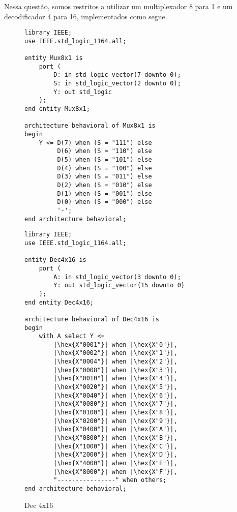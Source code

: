 \documentclass[a4paper,12pt]{article}
\newenvironment{code}{\captionsetup{type=listing}}{}
\newcommand{\hex}[1]{\textcolor{green!50!black}{#1}}
\begin{document}
Nessa questão, somos restritos a utilizar um multiplexador 8 para 1 e um decodificador 4 para 16, implementados como segue.
\begin{figure}[htbp]
    \centering
    \begin{minipage}[t]{0.49\textwidth}
        \centering
        \begin{code}
            \begin{verbatim}
library IEEE;
use IEEE.std_logic_1164.all;

entity Mux8x1 is
    port (
        D: in std_logic_vector(7 downto 0);
        S: in std_logic_vector(2 downto 0);
        Y: out std_logic
    );
end entity Mux8x1;

architecture behavioral of Mux8x1 is
begin
    Y <= D(7) when (S = "111") else
         D(6) when (S = "110") else
         D(5) when (S = "101") else
         D(4) when (S = "100") else
         D(3) when (S = "011") else
         D(2) when (S = "010") else
         D(1) when (S = "001") else
         D(0) when (S = "000") else
         '-';    
end architecture behavioral;
            \end{verbatim}
            \caption{Mux 8x1}
            \label{fig:mux8x1}
        \end{code}
    \end{minipage}
    \hfill
    \begin{minipage}[t]{0.49\textwidth}
        \centering
        \begin{code}
            \begin{verbatim}
library IEEE;
use IEEE.std_logic_1164.all;

entity Dec4x16 is
    port (
        A: in std_logic_vector(3 downto 0);
        Y: out std_logic_vector(15 downto 0)
    );
end entity Dec4x16;

architecture behavioral of Dec4x16 is
begin
    with A select Y <=
        |\hex{X"0001"}| when |\hex{X"0"}|,
        |\hex{X"0002"}| when |\hex{X"1"}|,
        |\hex{X"0004"}| when |\hex{X"2"}|,
        |\hex{X"0008"}| when |\hex{X"3"}|,
        |\hex{X"0010"}| when |\hex{X"4"}|,
        |\hex{X"0020"}| when |\hex{X"5"}|,
        |\hex{X"0040"}| when |\hex{X"6"}|,
        |\hex{X"0080"}| when |\hex{X"7"}|,
        |\hex{X"0100"}| when |\hex{X"8"}|,
        |\hex{X"0200"}| when |\hex{X"9"}|,
        |\hex{X"0400"}| when |\hex{X"A"}|,
        |\hex{X"0800"}| when |\hex{X"B"}|,
        |\hex{X"1000"}| when |\hex{X"C"}|,
        |\hex{X"2000"}| when |\hex{X"D"}|,
        |\hex{X"4000"}| when |\hex{X"E"}|,
        |\hex{X"8000"}| when |\hex{X"F"}|,
        "----------------" when others;
end architecture behavioral;
            \end{verbatim}
            \caption{Dec 4x16}
            \label{fig:dec4x16}
        \end{code}
    \end{minipage}
\end{figure}
\end{document}
